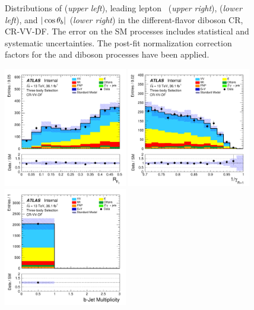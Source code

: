 \begin{figure}[!htb]
\begin{center}
        \caption{
            Distributions of \mdr (\textit{upper left}), leading lepton \pT~(\textit{upper right}),
            \dpb (\textit{lower left}), and $|\cos\theta_b|$ (\textit{lower right}) in the different-flavor diboson CR,
            CR-VV-DF.
            The error on the SM processes includes statistical and systematic uncertainties.
            The post-fit normalization correction factors for the \ttbar and diboson processes
            have been applied.
        }
        \label{fig:crvvDF_0}
    \end{center}
\end{figure}
\begin{figure}[!htb]
    \begin{center}
        \includegraphics[width=0.48\textwidth]{figures/search_stop2l/bkg_est/crvdf/crv_RPT}
        \includegraphics[width=0.48\textwidth]{figures/search_stop2l/bkg_est/crvdf/crv_gamInvRp1}
        \includegraphics[width=0.48\textwidth]{figures/search_stop2l/bkg_est/crvdf/crv_nBJets}

\end{center}
\end{figure}
